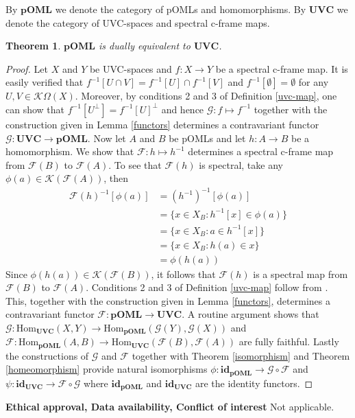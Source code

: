 \documentclass{amsart}
\theoremstyle{plain}
\newtheorem{theorem}{Theorem}[section]
\theoremstyle{definition}
\begin{document}
    By $\mathbf{pOML}$ we denote the category of pOMLs and homomorphisms. By $\mathbf{UVC}$ we denote the category of UVC-spaces and spectral c-frame maps. 

\begin{theorem}
    $\mathbf{pOML}$ is dually equivalent to $\mathbf{UVC}$. 
\end{theorem}
\begin{proof}
    Let $X$ and $Y$ be UVC-spaces and $f\colon X\to Y$ be a spectral c-frame map. It is easily verified that $f^{-1}[U\cap V]=f^{-1}[U]\cap f^{-1}[V]$ and $f^{-1}[\emptyset]=\emptyset$ for any $U,V\in\mathcal{K}\Omega(X)$. Moreover, by conditions 2 and 3 of Definition \ref{uvc-map}, one can show that $f^{-1}[U^{\perp}]=f^{-1}[U]^{\perp}$ and hence $\mathcal{G}\colon f\mapsto f^{-1}$ together with the construction given in Lemma \ref{functors} determines a contravariant functor $\mathcal{G}\colon\mathbf{UVC}\to\mathbf{pOML}$. Now let $A$ and $B$ be pOMLs and let $h\colon A\to B$ be a homomorphism. We show that $\mathcal{F}\colon h\mapsto h^{-1}$ determines a spectral c-frame map from $\mathcal{F}(B)$ to $\mathcal{F}(A)$. To see that $\mathcal{F}(h)$ is spectral, take any $\phi(a)\in\mathcal{K}(\mathcal{F}(A))$, then 
    \begin{align*}
        \mathcal{F}(h)^{-1}[\phi(a)]&=(h^{-1})^{-1}[\phi(a)]\\&=\{x\in X_B:h^{-1}[x]\in\phi(a)\}\\&=\{x\in X_B:a\in h^{-1}[x]\}\\&=\{x\in X_B:h(a)\in x\}\\&=\phi(h(a))
    \end{align*}
 Since $\phi(h(a))\in\mathcal{K}(\mathcal{F}(B))$, it follows that $\mathcal{F}(h)$ is a spectral map from $\mathcal{F}(B)$ to $\mathcal{F}(A)$. Conditions 2 and 3 of Definition \ref{uvc-map} follow from \cite[Lemma 3.9]{bimbo}. This, together with the construction given in Lemma \ref{functors}, determines a contravariant functor $\mathcal{F}\colon\mathbf{pOML}\to\mathbf{UVC}$. A routine argument shows that $\mathcal{G}\colon\text{Hom}_{\mathbf{UVC}}(X,Y)\to\text{Hom}_{\mathbf{pOML}}(\mathcal{G}(Y),\mathcal{G}(X))$ and $\mathcal{F}\colon\text{Hom}_{\mathbf{pOML}}(A,B)\to\text{Hom}_{\mathbf{UVC}}(\mathcal{F}(B),\mathcal{F}(A))$ are fully faithful. Lastly the constructions of $\mathcal{G}$ and $\mathcal{F}$ together with Theorem \ref{isomorphism} and Theorem \ref{homeomorphism} provide natural isomorphisms $\phi\colon\mathbf{id}_{\mathbf{pOML}}\to\mathcal{G}\circ\mathcal{F}$ and $\psi\colon\mathbf{id}_{\mathbf{UVC}}\to\mathcal{F}\circ\mathcal{G}$ where $\mathbf{id}_{\mathbf{pOML}}$ and $\mathbf{id}_{\mathbf{UVC}}$ are the identity functors.  
\end{proof}
\noindent\textbf{Ethical approval, Data availability, Conflict of interest} Not applicable.
\end{document}
